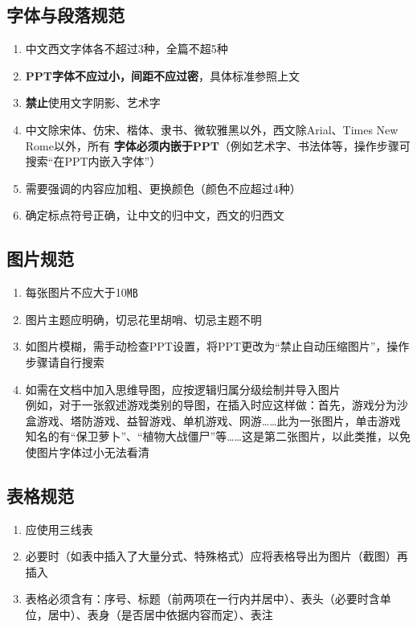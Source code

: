 \subsection[字体与段落规范]{字体与段落规范}
\begin{enumerate}
    \item 中文西文字体各不超过3种，全篇不超5种
    \item \textbf{PPT字体不应过小，间距不应过密}，具体标准参照上文
    \item \textbf{禁止}使用文字阴影、艺术字
    \item 中文除宋体、仿宋、楷体、隶书、微软雅黑以外，西文除Arial、Times New Rome以外，所有 \textbf{字体必须内嵌于PPT}（例如艺术字、书法体等，操作步骤可搜索“在PPT内嵌入字体”）
    \item 需要强调的内容应加粗、更换颜色（颜色不应超过4种）
    \item 确定标点符号正确，让中文的归中文，西文的归西文
\end{enumerate}

\subsection[图片规范]{图片规范}
\begin{enumerate}
    \item 每张图片不应大于10㎆\footnotemark
    \item 图片主题应明确，切忌花里胡哨、切忌主题不明
    \item 如图片模糊，需手动检查PPT设置，将PPT更改为“禁止自动压缩图片”，操作步骤请自行搜索
    \item 如需在文档中加入思维导图，应按逻辑归属分级绘制并导入图片\\
          例如，对于一张叙述游戏类别的导图，在插入时应这样做：首先，游戏分为沙盒游戏、塔防游戏、益智游戏、单机游戏、网游……此为一张图片，单击游戏知名的有“保卫萝卜”、“植物大战僵尸”等……这是第二张图片，以此类推，以免使图片字体过小无法看清
\end{enumerate}

\subsection[表格规范]{表格规范}
\begin{enumerate}
    \item 应使用三线表
    \item 必要时（如表中插入了大量分式、特殊格式）应将表格导出为图片（截图）再插入
    \item 表格必须含有：序号、标题（前两项在一行内并居中）、表头（必要时含单位，居中）、表身（是否居中依据内容而定）、表注
\end{enumerate}

